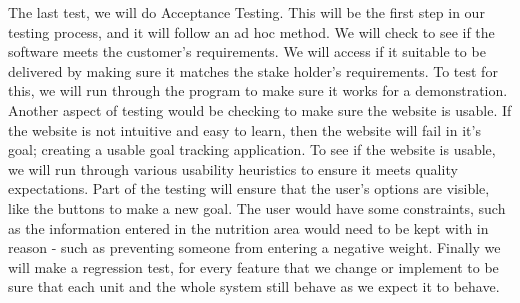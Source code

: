 \documentclass[a4paper]{article}
\begin{document}
\newline
\newline
The last test, we will do Acceptance Testing. This will be the first step in our testing process, and it will follow an ad hoc method. We will check to see if the software meets the customer's requirements. We will access if it suitable to be delivered by making sure it matches the stake holder's requirements.  To test for this, we will run through the program to make sure it works for a demonstration. 
\newline
\newline
Another aspect of testing would be checking to make sure the website is usable. If the website is not intuitive and easy to learn, then the website will fail in it's goal; creating a usable goal tracking application. To see if the website is usable, we will run through various usability heuristics to ensure it meets quality expectations. Part of the testing will ensure that the user's options are visible, like the buttons to make a new goal. The user would have some constraints, such as the information entered in the nutrition area would need to be kept with in reason - such as preventing someone from entering a negative weight.  
\newline
\newline
Finally we will make a regression test, for every feature that we change or implement to be sure that each unit and the whole system still behave as we expect it to behave.
\end{document}
